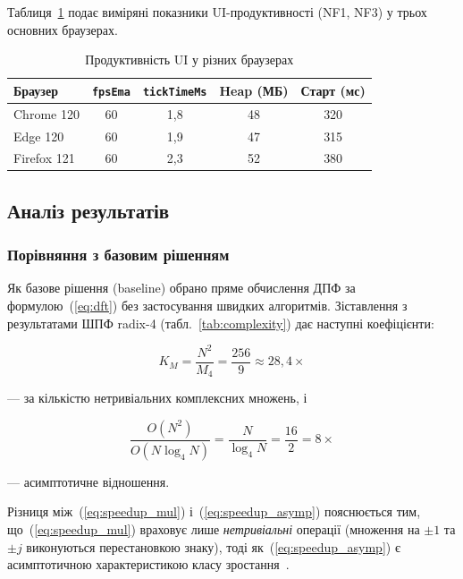 Таблиця~\ref{tab:ui_perf} подає виміряні показники UI-продуктивності
(NF1, NF3) у трьох основних браузерах.

\begin{table}[H]
  \caption{Продуктивність UI у різних браузерах}
  \label{tab:ui_perf}
  \centering
  \begin{tabular}{lcccc}
    \toprule
    Браузер & \texttt{fpsEma} & \texttt{tickTimeMs} & Heap (МБ) & Старт (мс) \\
    \midrule
    Chrome 120  & 60 & 1{,}8 & 48 & 320 \\
    Edge 120    & 60 & 1{,}9 & 47 & 315 \\
    Firefox 121 & 60 & 2{,}3 & 52 & 380 \\
    \bottomrule
  \end{tabular}
\end{table}


\subsection{Аналіз результатів}

\subsubsection*{Порівняння з базовим рішенням}

Як базове рішення (baseline) обрано пряме обчислення ДПФ за
формулою~(\ref{eq:dft}) без застосування швидких алгоритмів.
Зіставлення з результатами ШПФ radix-4 (табл.~\ref{tab:complexity})
дає наступні коефіцієнти:

\begin{equation}
  K_M = \frac{N^2}{M_4} = \frac{256}{9} \approx 28{,}4\times
  \label{eq:speedup_mul}
\end{equation}

--- за кількістю нетривіальних комплексних множень, і

\begin{equation}
  \frac{O(N^2)}{O(N \log_4 N)} = \frac{N}{\log_4 N} = \frac{16}{2} = 8\times
  \label{eq:speedup_asymp}
\end{equation}

--- асимптотичне відношення.

Різниця між~(\ref{eq:speedup_mul}) і~(\ref{eq:speedup_asymp}) пояснюється
тим, що~(\ref{eq:speedup_mul}) враховує лише \emph{нетривіальні} операції
(множення на $\pm 1$ та $\pm j$ виконуються перестановкою знаку),
тоді як~(\ref{eq:speedup_asymp}) є асимптотичною характеристикою
класу зростання~\cite{nussbaumer1982}.

